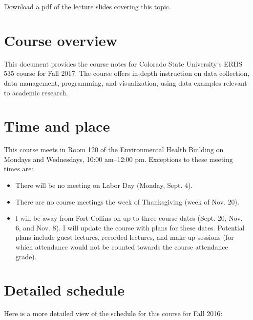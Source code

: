 \documentclass[]{book}
\providecommand{\tightlist}{%
  \setlength{\itemsep}{0pt}\setlength{\parskip}{0pt}}
\theoremstyle{definition}
\theoremstyle{definition}
\theoremstyle{definition}
\theoremstyle{remark}
\begin{document}
\href{https://github.com/geanders/RProgrammingForResearch/raw/master/slides/CourseOverview.pdf}{Download}
a pdf of the lecture slides covering this topic.

\section{Course overview}\label{course-overview}

This document provides the course notes for Colorado State University's
ERHS 535 course for Fall 2017. The course offers in-depth instruction on
data collection, data management, programming, and visualization, using
data examples relevant to academic research.

\section{Time and place}\label{time-and-place}

This course meets in Room 120 of the Environmental Health Building on
Mondays and Wednesdays, 10:00 am--12:00 pm. Exceptions to these meeting
times are:

\begin{itemize}
\tightlist
\item
  There will be no meeting on Labor Day (Monday, Sept. 4).
\item
  There are no course meetings the week of Thanksgiving (week of Nov.
  20).
\item
  I will be away from Fort Collins on up to three course dates (Sept.
  20, Nov. 6, and Nov. 8). I will update the course with plans for these
  dates. Potential plans include guest lectures, recorded lectures, and
  make-up sessions (for which attendance would not be counted towards
  the course attendance grade). 
\end{itemize}

\section{Detailed schedule}\label{detailed-schedule}

Here is a more detailed view of the schedule for this course for Fall
2016:
\end{document}
